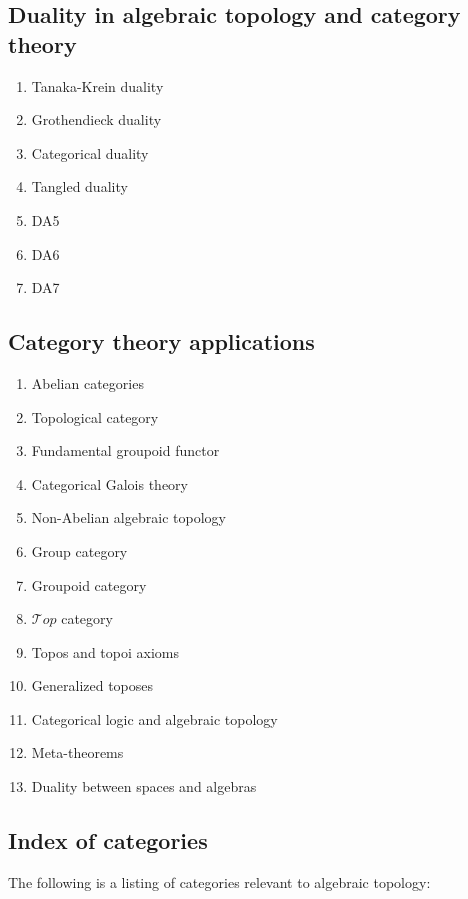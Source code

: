 \documentclass[12pt]{article}
\theoremstyle{plain}
\theoremstyle{definition}
\numberwithin{equation}{section}
\begin{document}
\subsection{Duality in algebraic topology and category theory}
\begin{enumerate}

\item Tanaka-Krein duality
\item Grothendieck duality
\item Categorical duality
\item Tangled duality
\item DA5
\item DA6
\item DA7

\end{enumerate}

\subsection{Category theory applications}
\begin{enumerate}
\item Abelian categories
\item Topological category
\item Fundamental groupoid functor
\item Categorical Galois theory
\item Non-Abelian algebraic topology
\item Group category
\item Groupoid category
\item $\mathcal{T}op$ category
\item Topos and topoi axioms
\item Generalized toposes
\item Categorical logic and algebraic topology
\item Meta-theorems
\item Duality between spaces and algebras

\end{enumerate}


\subsection{Index of categories}
The following is a listing of categories relevant to algebraic topology:
\end{document}
